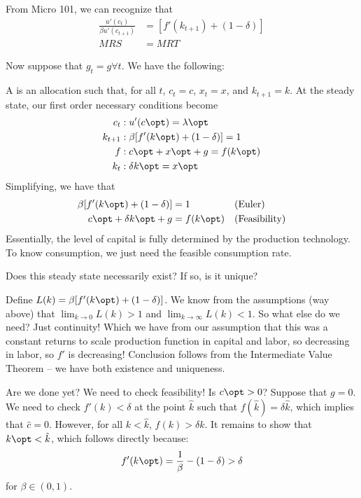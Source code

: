 \documentclass[10pt]{article}
\begin{document}
From Micro 101, we can recognize that
\begin{align*}
	\frac{u'(c_t)}{\beta u'(c_{t+1})} &= [f'(k_{t+1}) + (1-\delta)] \\MRS &= MRT
\end{align*}


Now suppose that $g_t = g \forall t$. We have the following:

\begin{definition}
	A  is an allocation such that, for all $t$, $c_t = c$, $x_t = x$, and $k_{t+1} = k$. At the steady state, our first order necessary conditions become
	\begin{align*}
		c_t &: u'(c\opt) = \lambda\opt \\ k_{t+1}&: \beta [f'(k\opt) + (1-\delta)] = 1\\ f&:c\opt + x\opt + g = f(k\opt) \\ k_t &: \delta k\opt = x\opt
	\end{align*}
	Simplifying, we have that
	\begin{align*}
		\beta[f'(k\opt)+(1-\delta) ]&= 1 &&\text{(Euler)} \\ c\opt + \delta k\opt + g &= f(k\opt) && \text{(Feasibility)}
	\end{align*}
	Essentially, the level of capital is fully determined by the production technology. To know consumption, we just need the feasible consumption rate. 
\end{definition}

\begin{question}
	Does this steady state necessarily exist? If so, is it unique?
\end{question}

\begin{solution}
	Define $L(k) = \beta[f'(k\opt)+(1-\delta) ]$. We know from the assumptions (way above) that $\lim_{k\to0}L(k) > 1$ and $\lim_{k\to\infty} L(k) < 1$. So what else do we need? Just continuity! Which we have from our assumption that this was a constant returns to scale production function in capital and labor, so decreasing in labor, so $f'$ is decreasing! Conclusion follows from the Intermediate Value Theorem -- we have both existence and uniqueness.
	
	Are we done yet? We need to check feasibility! Is $c\opt > 0$? Suppose that $g = 0$. We need to check $f'(k) < \delta$ at the point $\hat{k}$ such that $f(\hat{k}) = \delta \hat{k}$, which implies that $\hat{c}=0$. However, for all $k < \hat{k}$, $f(k) > \delta k$. It remains to show that $k\opt < \hat{k}$, which follows directly because:\[f'(k\opt) = \frac{1}{\beta} - (1-\delta) > \delta\]for $\beta \in (0,1)$.
\end{solution}
\end{document}
